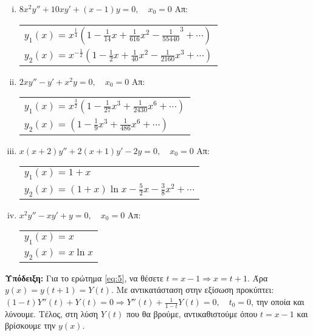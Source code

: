 \begin{enumerate}
		\begin{enumerate}[i)]
			\item $ 8x^{2}y'' + 10xy' + (x-1)y = 0, \quad x_{0} = 0 $ \hfill Απ: \begin{tabular}{l}
					$ \scriptstyle{y_{1}(x) = x^{\frac{1}{4}}\left(1 - \frac{1}{14}x + \frac{1}{616}x^{2} - \frac{1}{55440}^{3} + \cdots\right)}$ \\
					$ \scriptstyle{y_{2}(x) = x^{- \frac{1}{2}} \left(1 - \frac{1}{2} x + \frac{1}{40} x^{2} - \frac{1}{2160} x^{3} + \cdots\right)} $	
				\end{tabular}   

			\item $ 2xy'' - y' +x^{2}y = 0, \quad x_{0} = 0$ \hfill Απ: \begin{tabular}{l}
					$\scriptstyle{ y_{1}(x) = x^{\frac{3}{2}}\left(1 - \frac{1}{27}x^{3} +
					\frac{1}{2430}x^{6} + \cdots\right)}$  \\
					$\scriptstyle{ y_{2}(x) = \left(1 - \frac{1}{9} x^{3} + \frac{1}{486} x^{6} +
					\cdots\right)} $
				\end{tabular}

			\item $ x(x+2)y'' + 2(x+1)y' - 2y = 0, \quad x_{0} = 0$ \hfill Απ: \begin{tabular}{l}
					$ \scriptstyle{ y_{1}(x) = 1 + x} $ \\
					$ \scriptstyle{ y_{2}(x) = (1+x) \ln{x} - \frac{5}{2} x - \frac{3}{8} x^{2}} + \cdots $
				\end{tabular}  

			\item $ x^{2}y'' - xy' + y = 0, \quad x_{0} = 0 $ \hfill Απ: \begin{tabular}{l}
					$\scriptstyle{ y_{1}(x) = x }$ \\
					$\scriptstyle{ y_{2}(x) = x \ln{x}} $
				\end{tabular} 

		\end{enumerate}
\end{enumerate}

\vspace{\baselineskip}


\textbf{Υπόδειξη:} 
	Για το ερώτημα \ref{eq:5}, να θέσετε $ t = x - 1 \Rightarrow x = t+1 $. Άρα $ y(x) =
		y(t+1) = Y(t) $. Με αντικατάσταση στην εξίσωση προκύπτει:
		$ (1-t)Y''(t) + Y(t) = 0 \Rightarrow Y''(t) + \frac{1}{1-t} Y(t) = 0, \quad t_{0} = 0 $, την
		οποία και λύνουμε. Τέλος, στη λύση $ Y(t) $ που θα βρούμε, αντικαθιστούμε όπου $t=x-1 $  και βρίσκουμε την  $ y(x) $.



